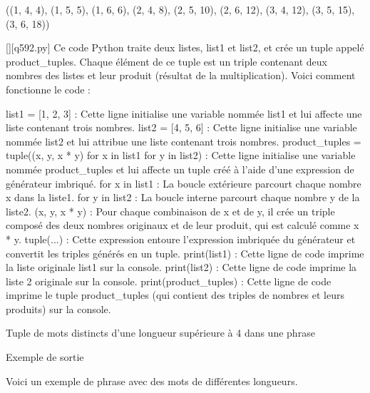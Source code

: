 ((1, 4, 4), (1, 5, 5), (1, 6, 6), (2, 4, 8), (2, 5, 10), (2, 6, 12), (3, 4, 12), (3, 5, 15), (3, 6, 18))
        \par
        \begin{solution}
            \renewcommand{\nomfichier}{q592.py}
            \pythonfile{\chemincode \nomfichier}[][\nomfichier]
            Ce code Python traite deux listes, list1 et list2, et crée un tuple appelé product_tuples. Chaque élément de ce tuple est un triple contenant deux nombres des listes et leur produit (résultat de la multiplication). Voici comment fonctionne le code :

    list1 = [1, 2, 3] : Cette ligne initialise une variable nommée list1 et lui affecte une liste contenant trois nombres.
    list2 = [4, 5, 6] : Cette ligne initialise une variable nommée list2 et lui attribue une liste contenant trois nombres.
    product_tuples = tuple((x, y, x * y) for x in list1 for y in list2) : Cette ligne initialise une variable nommée product_tuples et lui affecte un tuple créé à l'aide d'une expression de générateur imbriqué.
        for x in list1 : La boucle extérieure parcourt chaque nombre x dans la liste1.
        for y in list2 : La boucle interne parcourt chaque nombre y de la liste2.
        (x, y, x * y) : Pour chaque combinaison de x et de y, il crée un triple composé des deux nombres originaux et de leur produit, qui est calculé comme x * y.
        tuple(...) : Cette expression entoure l'expression imbriquée du générateur et convertit les triples générés en un tuple.
    print(list1) : Cette ligne de code imprime la liste originale list1 sur la console.
    print(list2) : Cette ligne de code imprime la liste 2 originale sur la console.
    print(product_tuples) : Cette ligne de code imprime le tuple product_tuples (qui contient des triples de nombres et leurs produits) sur la console.
        \end{solution}
        

        \question
        Tuple de mots distincts d'une longueur supérieure à 4 dans une phrase

Exemple de sortie

Voici un exemple de phrase avec des mots de différentes longueurs.

